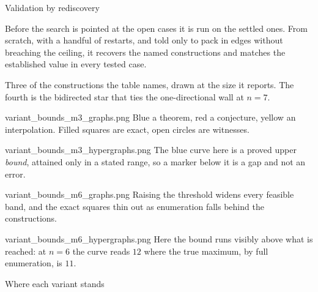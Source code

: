 \documentclass[aspectratio=1610,11pt]{beamer}
\begin{document}
\begin{frame}{Validation by rediscovery}
\vfill
\centering
{\small}

\vspace{16pt}
\begin{minipage}{0.88\textwidth}
{\footnotesize\color{black!60} Before the search is pointed at the open cases it is run on the settled ones. From scratch, with a handful of restarts, and told only to pack in edges without breaching the ceiling, it recovers the named constructions and matches the established value in every tested case.}
\end{minipage}
\vfill
\end{frame}

  {\figrediscovery}
  {Three of the constructions the table names, drawn at the size it reports. The fourth is the bidirected star that ties the one-directional wall at $n=7$.}


  {variant_bounds_m3_graphs.png}
  {Blue a theorem, red a conjecture, yellow an interpolation. Filled squares are exact, open circles are witnesses.}

  {variant_bounds_m3_hypergraphs.png}
  {The blue curve here is a proved upper \emph{bound}, attained only in a stated range, so a marker below it is a gap and not an error.}

  {variant_bounds_m6_graphs.png}
  {Raising the threshold widens every feasible band, and the exact squares thin out as enumeration falls behind the constructions.}

  {variant_bounds_m6_hypergraphs.png}
  {Here the bound runs visibly above what is reached: at $n=6$ the curve reads $12$ where the true maximum, by full enumeration, is $11$.}

\begin{frame}{Where each variant stands}
\vspace{2pt}
\centering
{}
\end{frame}
\end{document}
